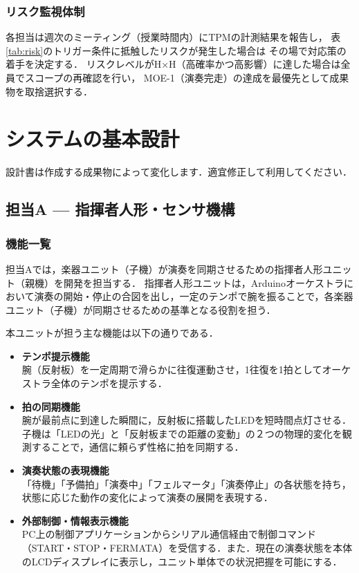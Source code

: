 \documentclass[lualatex,book,paper=a4paper,jafontsize=11.5pt,jafontscale=1.05,oneside]{jlreq}
\begin{document}
\subsection{リスク監視体制}

各担当は週次のミーティング（授業時間内）にTPMの計測結果を報告し，
表\ref{tab:risk}のトリガー条件に抵触したリスクが発生した場合は
その場で対応策の着手を決定する．
リスクレベルがH×H（高確率かつ高影響）に達した場合は全員でスコープの再確認を行い，
MOE-1（演奏完走）の達成を最優先として成果物を取捨選択する．
 
\chapter{システムの基本設計}

設計書は作成する成果物によって変化します．適宜修正して利用してください．

\section{担当A — 指揮者人形・センサ機構}

\subsection{機能一覧}
担当Aでは，楽器ユニット（子機）が演奏を同期させるための指揮者人形ユニット（親機）を開発を担当する．
指揮者人形ユニットは，Arduinoオーケストラにおいて演奏の開始・停止の合図を出し，一定のテンポで腕を振ることで，各楽器ユニット（子機）が同期させるための基準となる役割を担う．\par
本ユニットが担う主な機能は以下の通りである．

\begin{itemize}
    \item \textbf{テンポ提示機能}\\
    腕（反射板）を一定周期で滑らかに往復運動させ，1往復を1拍としてオーケストラ全体のテンポを提示する．

    \item \textbf{拍の同期機能}\\
    腕が最前点に到達した瞬間に，反射板に搭載したLEDを短時間点灯させる．子機は「LEDの光」と「反射板までの距離の変動」の２つの物理的変化を観測することで，通信に頼らず性格に拍を同期する．

    \item \textbf{演奏状態の表現機能}\\
    「待機」「予備拍」「演奏中」「フェルマータ」「演奏停止」の各状態を持ち，状態に応じた動作の変化によって演奏の展開を表現する．

    \item \textbf{外部制御・情報表示機能}\\
    PC上の制御アプリケーションからシリアル通信経由で制御コマンド（START・STOP・FERMATA）を受信する．また．現在の演奏状態を本体のLCDディスプレイに表示し，ユニット単体での状況把握を可能にする．
\end{itemize}
\end{document}
